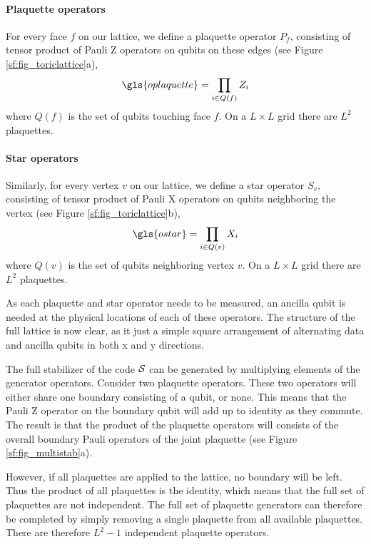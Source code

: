 \paragraph{Plaquette operators}
For every face $f$ on our lattice, we define a plaquette operator $P_f$, consisting of tensor product of Pauli Z operators on qubits on these edges (see Figure \ref{sf:fig_toriclattice}a),
\begin{equation}\label{eq:sf_plaquette}
  \gls{oplaquette} = \prod_{i\in Q(f)} Z_i
\end{equation}
where $Q(f)$ is the set of qubits touching face $f$. On a $L\times L$ grid there are $L^2$ plaquettes.

\paragraph{Star operators}
Similarly, for every vertex $v$ on our lattice, we define a star operator $S_v$, consisting of tensor product of Pauli X operators on qubits neighboring the vertex (see Figure \ref{sf:fig_toriclattice}b),
\begin{equation}\label{eq:sf_star}
  \gls{ostar} = \prod_{i\in Q(v)} X_i
\end{equation}
where $Q(v)$ is the set of qubits neighboring vertex $v$. On a $L\times L$ grid there are $L^2$ plaquettes.

As each plaquette and star operator needs to be measured, an ancilla qubit is needed at the physical locations of each of these operators. The structure of the full lattice is now clear, as it just a simple square arrangement of alternating data and ancilla qubits in both x and y directions.

The full stabilizer of the code $\mathcal{S}$ can be generated by multiplying elements of the generator operators. Consider two plaquette operators. These two operators will either share one boundary consisting of a qubit, or none. This means that the Pauli Z operator on the boundary qubit will add up to identity as they commute. The result is that the product of the plaquette operators will consists of the overall boundary Pauli operators of the joint plaquette (see Figure \ref{sf:fig_multistab}a).

However, if all plaquettes are applied to the lattice, no boundary will be left. Thus the product of all plaquettes is the identity, which means that the full set of plaquettes are not independent. The full set of plaquette generators can therefore be completed by simply removing a single plaquette from all available plaquettes. There are therefore $L^2 - 1$ independent plaquette operators.

